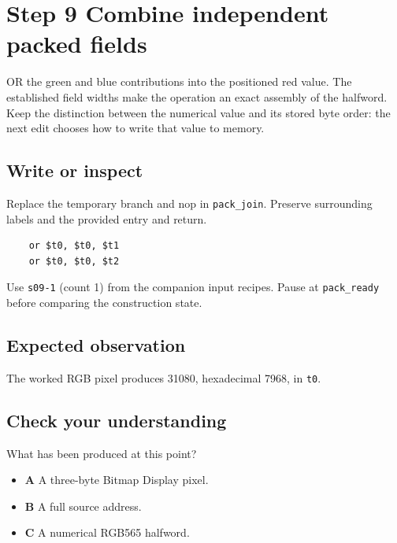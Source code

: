 \section{Step 9 Combine independent packed fields}\label{rgb-s09}

OR the green and blue contributions into the positioned red value. The established field widths make the operation an exact assembly of the halfword. Keep the distinction between the numerical value and its stored byte order: the next edit chooses how to write that value to memory.

\subsection{Write or inspect}
Replace the temporary branch and nop in \texttt{pack\_join}. Preserve surrounding labels and the provided entry and return.

\begin{verbatim}
    or $t0, $t0, $t1
    or $t0, $t0, $t2
\end{verbatim}
Use \texttt{s09-1} (count 1) from the companion input recipes. Pause at \texttt{pack\_ready} before comparing the construction state.

\subsection{Expected observation}
The worked RGB pixel produces 31080, hexadecimal 7968, in \texttt{t0}.

\subsection{Check your understanding}
What has been produced at this point?

\begin{itemize}
  \item \textbf{A} A three-byte Bitmap Display pixel.
  \item \textbf{B} A full source address.
  \item \textbf{C} A numerical RGB565 halfword.
\end{itemize}
